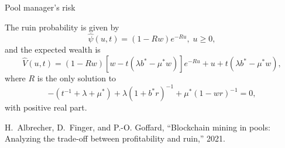 \documentclass{beamer}
\def \w{\widehat}
\begin{document}
\begin{frame}{Pool manager's risk}
\scriptsize
\begin{tcolorbox}[enhanced,drop shadow, title=Theorem (Profits and loss of a pool manager)]
The ruin probability is given by
\begin{equation*}\label{psiexpe}
    \widehat{\psi}(u,t) = (1-Rw)  e^{-R u},\;u\ge 0,
\end{equation*}
and the expected wealth is
\begin{equation*}\label{Vcombexpe}
    \w{V}(u,t) = (1 - Rw)[w-t(\lambda b^\ast-\mu^\ast w)] e^{-R u}+u+t(\lambda b^\ast-\mu^\ast w),
\end{equation*}
where $R$ is the only solution to 
\begin{equation*} \label{VLunde}
    -(t^{-1}+\lambda+\mu^\ast)+\lambda(1+b^\ast r)^{-1}+\mu^\ast(1-wr)^{-1}=0,
\end{equation*}
with positive real part.
\end{tcolorbox}
\tiny
  \begin{thebibliography}{1}

H.~Albrecher, D.~Finger, and P.-O. Goffard, ``Blockchain mining in pools:
  Analyzing the trade-off between profitability and ruin,'' 2021.


\end{thebibliography}
\end{frame}
\end{document}
